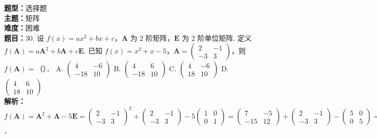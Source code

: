 \documentclass{ctexart}
\newenvironment{question}[5]{%
	\noindent\textbf{题型：}#1\\
	\textbf{主题：}#2\\
	\textbf{难度：}#3\\
	\textbf{题目：}#4\\
	\textbf{解析：}#5\\
	\vspace{1em}
}{}
\begin{document}
	\begin{question}
		{选择题}
		{矩阵}
		{困难}
		{30. 设 \(f(x)=a x^2+b x+c\)，\(\mathbf{A}\) 为 2 阶矩阵，\(\mathbf{E}\) 为 2 阶单位矩阵. 定义 \(f(\mathbf{A})=a \mathbf{A}^2+b \mathbf{A}+c \mathbf{E}\). 已知 \(f(x)=x^2+x-5\)，\(\mathbf{A}=\left(\begin{array}{cc}2 & -1 \\ -3 & 3\end{array}\right)\)，则 \(f(\mathbf{A})=\)（）．
			A. \(\left(\begin{array}{cc}4 & -6 \\ -18 & 10\end{array}\right)\)
			B. \(\left(\begin{array}{cc}4 & 6 \\ -18 & 10\end{array}\right)\)
			C. \(\left(\begin{array}{cc}4 & -6 \\ 18 & 10\end{array}\right)\)
			D. \(\left(\begin{array}{cc}4 & 6 \\ 18 & 10\end{array}\right)\)}
		{\(f(\mathbf{A})=\mathbf{A}^2+\mathbf{A}-5 \mathbf{E}=\left(\begin{array}{cc}2 & -1 \\ -3 & 3\end{array}\right)^2+\left(\begin{array}{cc}2 & -1 \\ -3 & 3\end{array}\right)-5\left(\begin{array}{ll}1 & 0 \\ 0 & 1\end{array}\right)=\left(\begin{array}{cc}7 & -5 \\ -15 & 12\end{array}\right)+\left(\begin{array}{cc}2 & -1 \\ -3 & 3\end{array}\right)-\left(\begin{array}{cc}5 & 0 \\ 0 & 5\end{array}\right)=\left(\begin{array}{cc}4 & -6 \\ -18 & 10\end{array}\right)\)．}
	\end{question}
	
\end{document}
